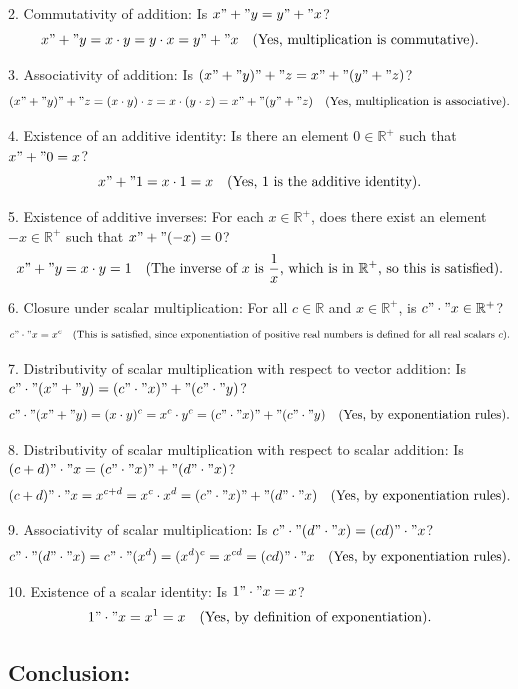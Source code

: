 \documentclass{article}
\begin{document}
2. Commutativity of addition: Is \( x " + " y = y " + " x \)?
   \[
   x " + " y = x \cdot y = y \cdot x = y " + " x \quad \text{(Yes, multiplication is commutative).}
   \]

3. Associativity of addition: Is \( (x " + " y) " + " z = x " + " (y " + " z) \)?
   \[
   (x " + " y) " + " z = (x \cdot y) \cdot z = x \cdot (y \cdot z) = x " + " (y " + " z) \quad \text{(Yes, multiplication is associative).}
   \]

4. Existence of an additive identity: Is there an element \( 0 \in \mathbb{R}^+ \) such that \( x " + " 0 = x \)?
   \[
   x " + " 1 = x \cdot 1 = x \quad \text{(Yes, 1 is the additive identity).}
   \]

5. Existence of additive inverses: For each \( x \in \mathbb{R}^+ \), does there exist an element \( -x \in \mathbb{R}^+ \) such that \( x " + " (-x) = 0 \)?
   \[
   x " + " y = x \cdot y = 1 \quad \text{(The inverse of \( x \) is \( \frac{1}{x} \), which is in \( \mathbb{R}^+ \), so this is satisfied).}
   \]

6. Closure under scalar multiplication: For all \( c \in \mathbb{R} \) and \( x \in \mathbb{R}^+ \), is \( c " \cdot " x \in \mathbb{R}^+ \)?
   \[
   c " \cdot " x = x^c \quad \text{(This is satisfied, since exponentiation of positive real numbers is defined for all real scalars \( c \)).}
   \]

7. Distributivity of scalar multiplication with respect to vector addition: Is \( c " \cdot " (x " + " y) = (c " \cdot " x) " + " (c " \cdot " y) \)?
   \[
   c " \cdot " (x " + " y) = (x \cdot y)^c = x^c \cdot y^c = (c " \cdot " x) " + " (c " \cdot " y) \quad \text{(Yes, by exponentiation rules).}
   \]

8. Distributivity of scalar multiplication with respect to scalar addition: Is \( (c + d) " \cdot " x = (c " \cdot " x) " + " (d " \cdot " x) \)?
   \[
   (c + d) " \cdot " x = x^{c+d} = x^c \cdot x^d = (c " \cdot " x) " + " (d " \cdot " x) \quad \text{(Yes, by exponentiation rules).}
   \]

9. Associativity of scalar multiplication: Is \( c " \cdot " (d " \cdot " x) = (cd) " \cdot " x \)?
   \[
   c " \cdot " (d " \cdot " x) = c " \cdot " (x^d) = (x^d)^c = x^{cd} = (cd) " \cdot " x \quad \text{(Yes, by exponentiation rules).}
   \]

10. Existence of a scalar identity: Is \( 1 " \cdot " x = x \)?
   \[
   1 " \cdot " x = x^1 = x \quad \text{(Yes, by definition of exponentiation).}
   \]

\subsection*{Conclusion:}
\end{document}
